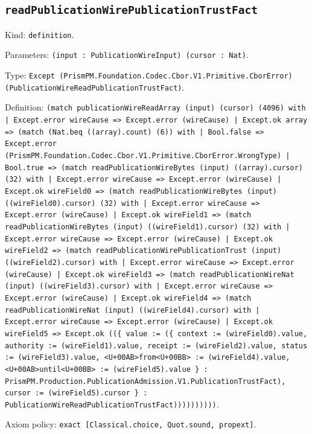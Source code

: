 \documentclass[11pt]{article}
\begin{document}
\subsection*{\texttt{readPublicationWirePublicationTrustFact}}
\noindent Kind: \texttt{definition}.\par
\noindent Parameters: \texttt{(input : PublicationWireInput) (cursor : Nat)}.\par
\noindent Type: \texttt{Except (PrismPM.Foundation.Codec.Cbor.V1.Primitive.CborError) (PublicationWireReadPublicationTrustFact)}.\par
\noindent Definition: \texttt{(match publicationWireReadArray (input) (cursor) (4096) with | Except.error wireCause => Except.error (wireCause) | Except.ok array => (match (Nat.beq ((array).count) (6)) with | Bool.false => Except.error (PrismPM.Foundation.Codec.Cbor.V1.Primitive.CborError.WrongType) | Bool.true => (match readPublicationWireBytes (input) ((array).cursor) (32) with | Except.error wireCause => Except.error (wireCause) | Except.ok wireField0 => (match readPublicationWireBytes (input) ((wireField0).cursor) (32) with | Except.error wireCause => Except.error (wireCause) | Except.ok wireField1 => (match readPublicationWireBytes (input) ((wireField1).cursor) (32) with | Except.error wireCause => Except.error (wireCause) | Except.ok wireField2 => (match readPublicationWirePublicationTrust (input) ((wireField2).cursor) with | Except.error wireCause => Except.error (wireCause) | Except.ok wireField3 => (match readPublicationWireNat (input) ((wireField3).cursor) with | Except.error wireCause => Except.error (wireCause) | Except.ok wireField4 => (match readPublicationWireNat (input) ((wireField4).cursor) with | Except.error wireCause => Except.error (wireCause) | Except.ok wireField5 => Except.ok ((\{ value := (\{ context := (wireField0).value, authority := (wireField1).value, receipt := (wireField2).value, status := (wireField3).value, <U+00AB>from<U+00BB> := (wireField4).value, <U+00AB>until<U+00BB> := (wireField5).value \} : PrismPM.Production.PublicationAdmission.V1.PublicationTrustFact), cursor := (wireField5).cursor \} : PublicationWireReadPublicationTrustFact))))))))))}.\par
\noindent Axiom policy: \texttt{exact [Classical.choice, Quot.sound, propext]}.\par
\end{document}
